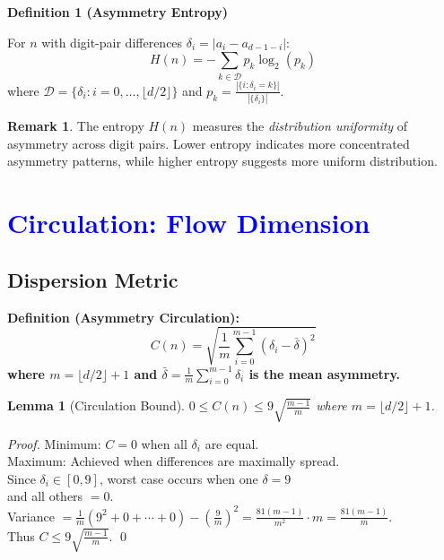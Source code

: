 \documentclass[11pt,a4paper]{article}
\theoremstyle{plain}
\newtheorem{lemma}[theorem]{Lemma}
\theoremstyle{definition}
\newtheorem{remark}[theorem]{Remark}
\newenvironment{definitionbox}
    {\begin{center}\begin{minipage}{0.95\textwidth}\color{blue}\bfseries}
    {\end{minipage}\end{center}}
\begin{document}
\begin{definitionbox}
\textbf{Definition 1 (Asymmetry Entropy)}\label{def:asymmetry_entropy}

For $n$ with digit-pair differences $\delta_i = |a_i - a_{d-1-i}|$:
\[
H(n) = -\sum_{k \in \mathcal{D}} p_k \log_2(p_k)
\]
where $\mathcal{D} = \{\delta_i : i = 0, \ldots, \lfloor d/2 \rfloor\}$ and $p_k = \frac{|\{i : \delta_i = k\}|}{|\{\delta_i\}|}$.
\end{definitionbox}

\begin{remark}
The entropy $H(n)$ measures the \emph{distribution uniformity} of asymmetry across digit pairs. Lower entropy indicates more concentrated asymmetry patterns, while higher entropy suggests more uniform distribution.
\end{remark}

\section{\textcolor{blue}{Circulation: Flow Dimension}}

\subsection{Dispersion Metric}

\begin{definitionbox}
\textbf{Definition (Asymmetry Circulation):}
\[C(n) = \sqrt{\frac{1}{m}\sum_{i=0}^{m-1} (\delta_i - \bar{\delta})^2}\]
where $m = \lfloor d/2 \rfloor + 1$ and $\bar{\delta} = \frac{1}{m}\sum_{i=0}^{m-1} \delta_i$ is the mean asymmetry.
\end{definitionbox}

\begin{lemma}[Circulation Bound]\label{lem:circ_bound}
$0 \leq C(n) \leq 9\sqrt{\frac{m-1}{m}}$ where $m = \lfloor d/2 \rfloor + 1$.
\end{lemma}

\begin{proof}
Minimum: $C = 0$ when all $\delta_i$ are equal.\\
Maximum: Achieved when differences are maximally spread. \\
Since $\delta_i \in [0,9]$, worst case occurs when one $\delta = 9$ \\
and all others $= 0$.\\
Variance $= \frac{1}{m}(9^2 + 0 + \cdots + 0) - \left(\frac{9}{m}\right)^2 = \frac{81(m-1)}{m^2} \cdot m = \frac{81(m-1)}{m}$.\\
Thus $C \leq 9\sqrt{\frac{m-1}{m}}$. \qed
\end{proof}
\end{document}
